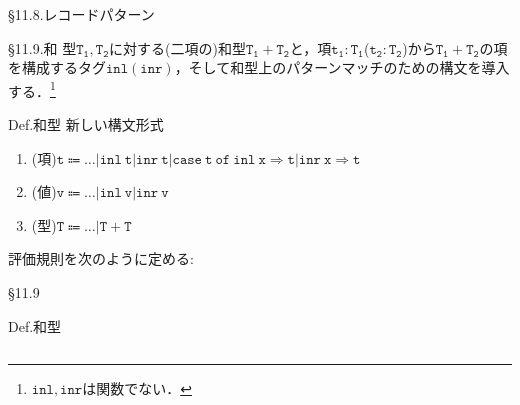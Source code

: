 \documentclass[9pt]{beamer}
\begin{document}
\begin{frame}{\S11.8.レコードパターン}

\end{frame}
\begin{frame}{\S11.9.和}
型$\mathtt{T_{1},T_{2}}$に対する(二項の)和型$\mathtt{T_{1}+T_{2}}$と，項$\mathtt{t_{1}:T_{1}}$($\mathtt{t_{2}:T_{2}}$)から$\mathtt{T_{1}+T_{2}}$の項を構成するタグ$\mathtt{inl}(\mathtt{inr})$，そして和型上のパターンマッチのための構文を導入する．\footnote{$\mathtt{inl,inr}$は関数でない．}
\begin{alertblock}{Def.和型}
新しい構文形式\begin{enumerate}
\item (項)$\mathtt{t\Coloneq\ldots|inl\ t|inr\ t|case\ t\ of\ inl\ x\Rightarrow t|inr\ x\Rightarrow t}$
\item (値)$\mathtt{v\Coloneq\ldots|inl\ v|inr\ v}$
\item (型)$\mathtt{T\Coloneq\ldots|T+T}$
\end{enumerate}
評価規則を次のように定める:
\end{alertblock}
\end{frame}
\begin{frame}{\S11.9}
\begin{alertblock}{Def.和型}
\begin{columns}
\begin{column}{0.5\columnwidth}
\end{column}
\begin{column}{0.5\columnwidth}
\end{column}
\end{columns}
\end{alertblock}
\end{frame}
\end{document}
